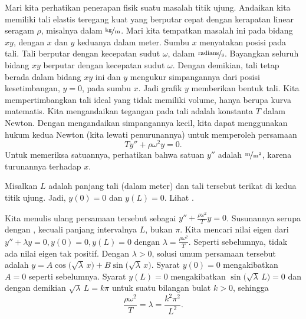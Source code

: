 Mari kita perhatikan penerapan fisik suatu masalah titik ujung.
Andaikan kita memiliki tali elastis teregang kuat yang berputar cepat
dengan kerapatan linear seragam $\rho$, misalnya dalam
$\unitfrac{kg}{m}$.
Mari kita tempatkan masalah ini pada bidang $xy$, dengan $x$ dan $y$
keduanya dalam meter.  Sumbu $x$ menyatakan
posisi pada tali.  Tali berputar dengan kecepatan sudut $\omega$,
dalam $\unitfrac{radians}{s}$.
Bayangkan seluruh bidang $xy$ berputar dengan kecepatan sudut $\omega$.
Dengan demikian, tali tetap berada dalam bidang $xy$ ini dan $y$
mengukur simpangannya dari posisi kesetimbangan, $y=0$, pada sumbu $x$.
Jadi grafik $y$ memberikan bentuk tali.
Kita mempertimbangkan tali ideal yang
tidak memiliki volume, hanya berupa kurva matematis.
Kita mengandaikan tegangan pada tali adalah konstanta $T$ dalam Newton.
Dengan mengandaikan simpangannya kecil,
kita dapat menggunakan hukum kedua Newton (kita lewati penurunannya) untuk memperoleh persamaan
\begin{equation*}
T y'' + \rho \omega^2 y = 0 .
\end{equation*}
Untuk memeriksa satuannya, perhatikan bahwa satuan $y''$ adalah $\unitfrac{m}{m^2}$, karena turunannya
terhadap $x$.

Misalkan $L$ adalah panjang tali (dalam meter) dan tali tersebut
terikat di kedua titik ujung.
Jadi, $y(0) = 0$ dan $y(L) = 0$.  Lihat
.

\begin{myfig}
\capstart
{}
\caption{Tali yang berputar.\label{bvp:whirstringfig}}
\end{myfig}

Kita menulis ulang persamaan tersebut sebagai
$y'' + \frac{\rho \omega^2}{T} y = 0$.
Susunannya serupa dengan , kecuali
panjang intervalnya $L$, bukan $\pi$.  Kita mencari nilai eigen
dari $y'' + \lambda y = 0, y(0) = 0, y(L) = 0$ dengan
$\lambda = \frac{\rho \omega^2}{T}$.  Seperti sebelumnya,
tidak ada nilai eigen tak positif.  Dengan $\lambda > 0$,
solusi umum persamaan tersebut adalah
$y = A \cos \bigl(  \sqrt{\lambda} \,x \bigr)
+ B \sin \bigl( \sqrt{\lambda} \,x \bigr)$.
Syarat $y(0) = 0$ mengakibatkan $A = 0$ seperti
sebelumnya.  Syarat $y(L) = 0$ mengakibatkan
$\sin \bigl( \sqrt{\lambda} \, L\bigr) = 0$ dan dengan demikian
$\sqrt{\lambda} \, L = k \pi$ untuk suatu bilangan bulat $k > 0$, sehingga
\begin{equation*}
\frac{\rho \omega^2}{T} = \lambda = \frac{k^2 \pi^2}{L^2} .
\end{equation*}

